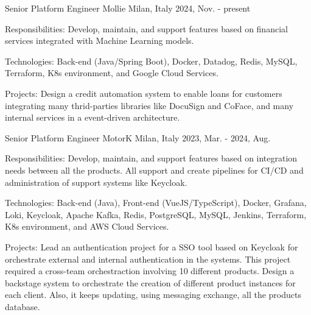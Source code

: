 

\begin{cventries}
  \cventry
    {Senior Platform Engineer} %
    {Mollie} %
    {Milan, Italy} %
    {2024, Nov. - present} %
    {
          \begin{cvitems} %
            \item {Responsibilities: Develop, maintain, and support features based on financial services integrated with Machine Learning models.}
            \item {Technologies: Back-end (Java/Spring Boot), Docker, Datadog, Redis, MySQL, Terraform, K8s environment, and Google Cloud Services.}
            \item {Projects: Design a credit automation system to enable loans for customers integrating many thrid-parties libraries like DocuSign and CoFace, and many internal services in a event-driven architecture.}
          \end{cvitems}
    }

  \cventry
    {Senior Platform Engineer} %
    {MotorK} %
    {Milan, Italy} %
    {2023, Mar. - 2024, Aug.} %
    {
          \begin{cvitems} %
            \item {Responsibilities: Develop, maintain, and support features based on integration needs between all the products. All support and create pipelines for CI/CD and administration of support systems like Keycloak.}
            \item {Technologies: Back-end (Java), Front-end (VueJS/TypeScript), Docker, Grafana, Loki, Keycloak, Apache Kafka, Redis, PostgreSQL, MySQL, Jenkins, Terraform, K8s environment, and AWS Cloud Services.}
            \item {Projects: Lead an authentication project for a SSO tool based on Keycloak for orchestrate external and internal authentication in the systems. This project required a cross-team orchestraction involving 10 different products. Design a backstage system to orchestrate the creation of different product instances for each client. Also, it keeps updating, using messaging exchange, all the products database.}
          \end{cvitems}
    }


\end{cventries}

